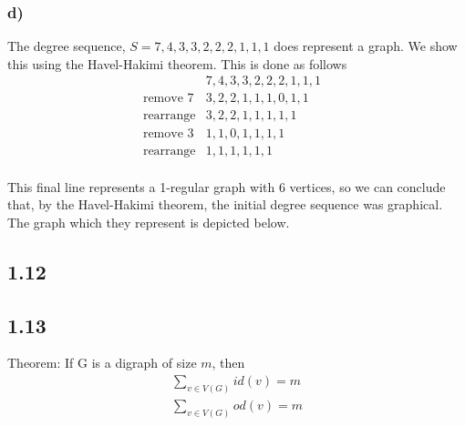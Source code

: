 \documentclass[a4paper]{article}
\begin{document}
\subsubsection*{d)}

The degree sequence, $S=7,4,3,3,2,2,2,1,1,1$ does represent a graph. We show this using the Havel-Hakimi theorem. This is done as follows
\begin{eqnarray*}
    &7,4,3,3,2,2,2,1,1,1&\\
    \text{remove 7} &3,2,2,1,1,1,0,1,1& \\ 
    \text{rearrange} &3,2,2,1,1,1,1,1& \\ 
    \text{remove 3} &1,1,0,1,1,1,1& \\
    \text{rearrange} &1,1,1,1,1,1& \\
\end{eqnarray*}

This final line represents a 1-regular graph with 6 vertices, so we can conclude that, by the Havel-Hakimi theorem, the initial degree sequence was graphical. The graph which they represent is depicted below.


\subsection*{1.12} 

\subsection*{1.13}

Theorem: If G is a digraph of size $m$, then
\begin{align*} 
    \sum_{v \in V(G)} id(v) = m\\
    \sum_{v \in V(G)} od(v) = m\\
\end{align*}
\end{document}
